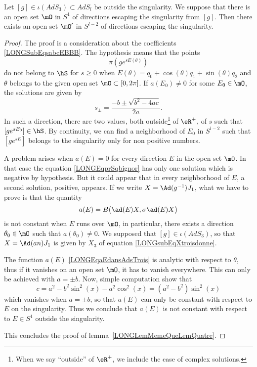 %
\begin{lemma}        \label{LONGLemMemeQueLemQuatre}
    Let $[g]\in\iota(AdS_3)\subset AdS_l$ be outside the singularity. We suppose that there is an open set $\mO$ in $S^1$ of directions escaping the singularity from $[g]$. Then there exists an open set $\mO'$ in $S^{l-2}$ of directions escaping the singularity.
\end{lemma}

\begin{proof}
    The proof is a consideration about the coefficients \eqref{LONGSubEqsabcEBBB}. The hypothesis means that the points
\begin{equation}
    \pi\left( g e^{sE(\theta)} \right)
\end{equation}
do not belong to $\hS$ for $s\geq 0$ when $E(\theta)=q_0+\cos(\theta)q_1+\sin(\theta)q_2$ and $\theta$ belongs to the given open set $\mO\subset\mathopen[ 0 , 2\pi \mathclose]$. If $a(E_0)\neq 0$ for some $E_0\in\mO$, the solutions are given by
\begin{equation}
    s_{\pm}=\frac{ -b\pm\sqrt{b^2-4ac} }{ 2a }.
\end{equation}
In such a direction, there are two values, both outside\footnote{When we say ``outside'' of $\eR^+$, we include the case of complex solutions.} of $\eR^+$, of $s$ such that $[g e^{sE_0}]\in \hS$. By continuity, we can find a neighborhood of $E_0$ in $S^{l-2}$ such that $[g e^{sE}]$ belongs to the singularity only for non positive numbers.

A problem arises when $a(E)=0$ for every direction $E$ in the open set $\mO$. In that case the equation \eqref{LONGEqprSqbignor} has only one solution which is negative by hypothesis. But it could appear that in every neighborhood of $E$, a second solution, positive, appears. If we write $X=\Ad(g^{-1})J_1$, what we have to prove is that the quantity
\begin{equation}
    a(E)=B\big( \ad(E)X,\sigma\ad(E)X \big)
\end{equation}
is not constant when $E$ runs over $\mO$, in particular, there exists a direction $\theta_0\in\mO$ such that $a(\theta_0)\neq 0$. We supposed that $[g]\in \iota(AdS_3)$, so that $X=\Ad(an)J_1$ is given by $X_3$ of equation \eqref{LONGsubEqXtroisdonne}.


The function $a(E)$ \eqref{LONGEqaEdansAdsTrois} is analytic with respect to $\theta$, thus if it vanishes on an open set $\mO$, it has to vanish everywhere. This can only be achieved with $a=\pm b$. Now, simple computation show that
\begin{equation}
    c=a^2-b^2\sin^2(x)-a^2\cos^2(x)=(a^2-b^2)\sin^2(x)
\end{equation}
which vanishes when $a=\pm b$, so that $a(E)$ can only be constant with respect to $E$ on the singularity. Thus we conclude that $a(E)$ is not constant with respect to $E\in S^1$ outside the singularity.

This concludes the proof of lemma~\ref{LONGLemMemeQueLemQuatre}.
\end{proof}
%

